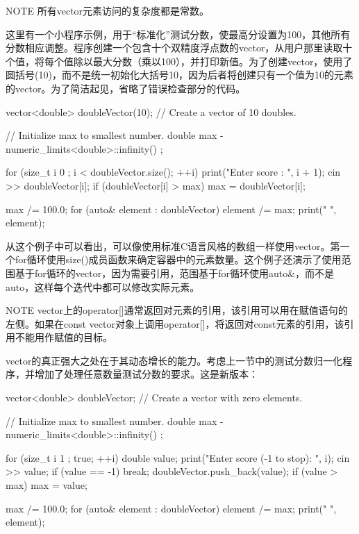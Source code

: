 \begin{myNotic}{NOTE}
所有vector元素访问的复杂度都是常数。
\end{myNotic}

这里有一个小程序示例，用于“标准化”测试分数，使最高分设置为100，其他所有分数相应调整。程序创建一个包含十个双精度浮点数的vector，从用户那里读取十个值，将每个值除以最大分数（乘以100），并打印新值。为了创建vector，使用了圆括号(10)，而不是统一初始化大括号{10}，因为后者将创建只有一个值为10的元素的vector。为了简洁起见，省略了错误检查部分的代码。

\begin{cpp}
vector<double> doubleVector(10); // Create a vector of 10 doubles.

// Initialize max to smallest number.
double max { -numeric_limits<double>::infinity() };

for (size_t i { 0 }; i < doubleVector.size(); ++i) {
    print("Enter score {}: ", i + 1);
    cin >> doubleVector[i];
    if (doubleVector[i] > max) {
        max = doubleVector[i];
    }
}

max /= 100.0;
for (auto& element : doubleVector) {
    element /= max;
    print("{} ", element);
}
\end{cpp}

从这个例子中可以看出，可以像使用标准C语言风格的数组一样使用vector。第一个for循环使用size()成员函数来确定容器中的元素数量。这个例子还演示了使用范围基于for循环的vector，因为需要引用，范围基于for循环使用auto\&，而不是auto，这样每个迭代中都可以修改实际元素。

\begin{myNotic}{NOTE}
vector上的operator[]通常返回对元素的引用，该引用可以用在赋值语句的左侧。如果在const vector对象上调用operator[]，将返回对const元素的引用，该引用不能用作赋值的目标。
\end{myNotic}


vector的真正强大之处在于其动态增长的能力。考虑上一节中的测试分数归一化程序，并增加了处理任意数量测试分数的要求。这是新版本：

\begin{cpp}
vector<double> doubleVector; // Create a vector with zero elements.

// Initialize max to smallest number.
double max { -numeric_limits<double>::infinity() };

for (size_t i { 1 }; true; ++i) {
    double value;
    print("Enter score {} (-1 to stop): ", i);
    cin >> value;
    if (value == -1) {
        break;
    }
    doubleVector.push_back(value);
    if (value > max) {
        max = value;
    }
}

max /= 100.0;
for (auto& element : doubleVector) {
    element /= max;
    print("{} ", element);
}
\end{cpp}

